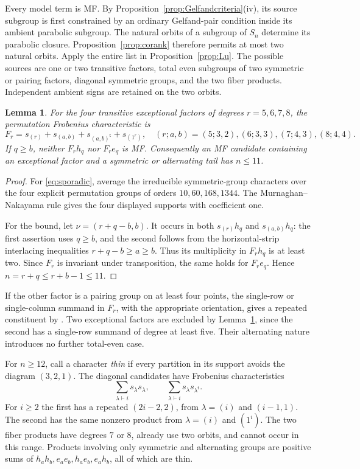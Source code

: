 \documentclass[11pt]{article}
\numberwithin{equation}{section}
\newtheorem{lemma}[theorem]{Lemma}
\theoremstyle{definition}
\newcommand{\transpose}{\mathsf t}
\begin{document}
Every model term is MF.
By Proposition~\ref{prop:Gelfandcriteria}(iv), its source subgroup is
first constrained by an ordinary Gelfand-pair condition inside its
ambient parabolic subgroup.
The natural orbits of a subgroup of \(S_n\) determine its parabolic closure.
Proposition~\ref{prop:corank} therefore permits at most two natural orbits.
Apply the entire list in Proposition~\ref{prop:Lu}.
The possible sources are one or two transitive factors, total even subgroups of two symmetric or pairing factors, diagonal symmetric groups, and the two fiber products.
Independent ambient signs are retained on the two orbits.

\begin{lemma}\label{lem:sporadic}
For the four transitive exceptional factors of degrees \(r=5,6,7,8\), the permutation Frobenius characteristic is
\begin{equation}
 F_r=s_{(r)}+s_{(a,b)}+s_{(a,b)^\transpose}+s_{(1^r)},
 \quad (r;a,b)=(5;3,2),(6;3,3),(7;4,3),(8;4,4).
 \label{eq:sporadic}
\end{equation}
If \(q\geq b\), neither \(F_rh_q\) nor \(F_re_q\) is MF.
Consequently an MF candidate containing an exceptional factor and a symmetric or alternating tail has \(n\leq11\).
\end{lemma}
\begin{proof}
For \eqref{eq:sporadic}, average the irreducible symmetric-group characters over the four explicit permutation groups of orders \(10,60,168,1344\).
The Murnaghan--Nakayama rule gives the four displayed supports with coefficient one.

For the bound, let \(\nu=(r+q-b,b)\).
It occurs in both \(s_{(r)}h_q\) and \(s_{(a,b)}h_q\): the first assertion uses \(q\geq b\), and the second follows from the horizontal-strip interlacing inequalities
\(r+q-b\geq a\geq b\).
Thus its multiplicity in \(F_rh_q\) is at least two.
Since \(F_r\) is invariant under transposition, the same holds for \(F_re_q\).
Hence \(n=r+q\leq r+b-1\leq11\).
\end{proof}

If the other factor is a pairing group on at least four points, the single-row or single-column summand in \(F_r\), with the appropriate orientation, gives a repeated constituent by \cite[Lemma 3.1(a,b)]{MZperfect}.
Two exceptional factors are excluded by Lemma~\ref{lem:sporadic}, since the second has a single-row summand of degree at least five.
Their alternating nature introduces no further total-even case.

For \(n\geq12\), call a character \emph{thin} if every partition in its support avoids the diagram \((3,2,1)\).
The diagonal candidates have Frobenius characteristics
\[
 \sum_{\lambda\vdash i}s_\lambda s_\lambda,\qquad
 \sum_{\lambda\vdash i}s_\lambda s_{\lambda^\transpose}.
\]
For \(i\geq2\) the first has a repeated \((2i-2,2)\), from \(\lambda=(i)\) and \((i-1,1)\).
The second has the same nonzero product from \(\lambda=(i)\) and \((1^i)\).
The two fiber products have degrees \(7\) or \(8\), already use two orbits, and cannot occur in this range.
Products involving only symmetric and alternating groups are positive sums of
\(h_ah_b,e_ae_b,h_ae_b,e_ah_b\), all of which are thin.
\end{document}
